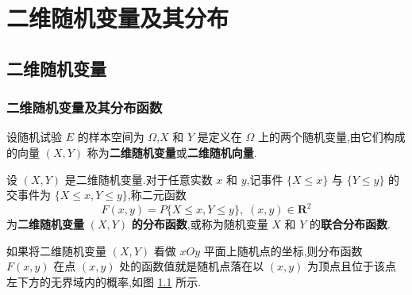 
\chapter{二维随机变量及其分布}
\thispagestyle{plain}

\section{二维随机变量}

\subsection{二维随机变量及其分布函数}

\begin{definition}
    设随机试验 $E$ 的样本空间为 $\varOmega$,$X$ 和 $Y$ 是定义在 $\varOmega$ 上的两个随机变量,由它们构成的向量 $(X,Y)$ 称为\textbf{二维随机变量}或\textbf{二维随机向量}.
\end{definition}

\begin{definition}
    设 $(X,Y)$ 是二维随机变量.对于任意实数 $x$ 和 $y$,记事件 $\{X \leqslant x\}$ 与 $\{Y \leqslant y\}$ 的交事件为 $\{X \leqslant x, Y \leqslant y\}$,称二元函数
    $$
    F(x, y) = P\{X \leqslant x, Y \leqslant y\}, \; (x,y) \in \mathbf{R}^2
    $$
    为\textbf{二维随机变量} $(X,Y)$ \textbf{的分布函数},或称为随机变量 $X$ 和 $Y$ 的\textbf{联合分布函数}.
\end{definition}

如果将二维随机变量 $(X,Y)$ 看做 $xOy$ 平面上随机点的坐标,则分布函数 $F(x,y)$ 在点 $(x,y)$ 处的函数值就是随机点落在以 $(x,y)$ 为顶点且位于该点左下方的无界域内的概率,如图 \ref{fig:F(x,y)} 所示.

\begin{figure}[htbp]
    \centering


    \caption{}
    \label{fig:F(x,y)}
\end{figure}


